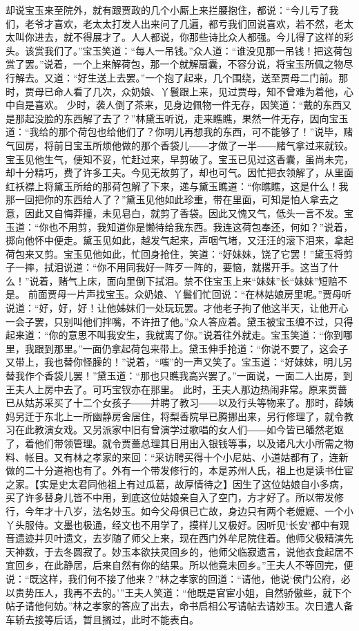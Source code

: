 \documentclass[12pt,oneside]{book}
\begin{document}
却说宝玉来至院外，就有跟贾政的几个小厮上来拦腰抱住，都说：“今儿亏了我们，老爷才喜欢，老太太打发人出来问了几遍，都亏我们回说喜欢，若不然，老太太叫你进去，就不得展才了。人人都说，你那些诗比众人都强。今儿得了这样的彩头。该赏我们了。”宝玉笑道：“每人一吊钱。”众人道：“谁没见那一吊钱！把这荷包赏了罢。”说着，一个上来解荷包，那一个就解扇囊，不容分说，将宝玉所佩之物尽行解去。又道：“好生送上去罢。”一个抱了起来，几个围绕，送至贾母二门前。那时，贾母已命人看了几次，众奶娘、丫鬟跟上来，见过贾母，知不曾难为着他，心中自是喜欢。
少时，袭人倒了茶来，见身边佩物一件无存，因笑道：“戴的东西又是那起没脸的东西解了去了？”林黛玉听说，走来瞧瞧，果然一件无存，因向宝玉道：“我给的那个荷包也给他们了？你明儿再想我的东西，可不能够了！”说毕，赌气回房，将前日宝玉所烦他做的那个香袋儿――才做了一半――赌气拿过来就铰。宝玉见他生气，便知不妥，忙赶过来，早剪破了。宝玉已见过这香囊，虽尚未完，却十分精巧，费了许多工夫。今见无故剪了，却也可气。因忙把衣领解了，从里面红袄襟上将黛玉所给的那荷包解了下来，递与黛玉瞧道：“你瞧瞧，这是什么！我那一回把你的东西给人了？”黛玉见他如此珍重，带在里面，可知是怕人拿去之意，因此又自悔莽撞，未见皂白，就剪了香袋。因此又愧又气，低头一言不发。宝玉道：“你也不用剪，我知道你是懒待给我东西。我连这荷包奉还，何如？”说着，掷向他怀中便走。黛玉见如此，越发气起来，声咽气堵，又汪汪的滚下泪来，拿起荷包来又剪。宝玉见他如此，忙回身抢住，笑道：“好妹妹，饶了它罢！”黛玉将剪子一摔，拭泪说道：“你不用同我好一阵歹一阵的，要恼，就撂开手。这当了什么！”说着，赌气上床，面向里倒下拭泪。禁不住宝玉上来“妹妹”长“妹妹”短赔不是。
前面贾母一片声找宝玉。众奶娘、丫鬟们忙回说：“在林姑娘房里呢。”贾母听说道：“好，好，好！让他姊妹们一处玩玩罢。才他老子拘了他这半天，让他开心一会子罢，只别叫他们拌嘴，不许扭了他。”众人答应着。黛玉被宝玉缠不过，只得起来道：“你的意思不叫我安生，我就离了你。”说着往外就走。宝玉笑道︰“你到哪里，我跟到那里。”一面仍拿起荷包来带上。黛玉伸手抢道：“你说不要了，这会子又带上，我也替你怪臊的！”说着，“嗤”的一声又笑了。宝玉道：“好妹妹，明儿另替我作个香袋儿罢！”黛玉道：“那也只瞧我高兴罢了。”一面说，一面二人出房，到王夫人上房中去了。可巧宝钗亦在那里。
此时，王夫人那边热闹非常。原来贾蔷已从姑苏采买了十二个女孩子――并聘了教习――以及行头等物来了。那时，薛姨妈另迁于东北上一所幽静房舍居住，将梨香院早已腾挪出来，另行修理了，就令教习在此教演女戏。又另派家中旧有曾演学过歌唱的女人们――如今皆已皤然老妪了，着他们带领管理。就令贾蔷总理其日用出入银钱等事，以及诸凡大小所需之物料、帐目。又有林之孝家的来回：“采访聘买得十个小尼姑、小道姑都有了，连新做的二十分道袍也有了。外有一个带发修行的，本是苏州人氏，祖上也是读书仕宦之家。【实是史太君同他祖上有过瓜葛，故厚情待之】因生了这位姑娘自小多病，买了许多替身儿皆不中用，到底这位姑娘亲自入了空门，方才好了。所以带发修行，今年才十八岁，法名妙玉。如今父母俱已亡故，身边只有两个老嬷嬷、一个小丫头服侍。文墨也极通，经文也不用学了，摸样儿又极好。因听见‘长安’都中有观音遗迹并贝叶遗文，去岁随了师父上来，现在西门外牟尼院住着。他师父极精演先天神数，于去冬圆寂了。妙玉本欲扶灵回乡的，他师父临寂遗言，说他衣食起居不宜回乡，在此静居，后来自然有你的结果。所以他竟未回乡。”王夫人不等回完，便说：“既这样，我们何不接了他来？”林之孝家的回道：“请他，他说‘侯门公府，必以贵势压人，我再不去的。’”王夫人笑道：“他既是官宦小姐，自然骄傲些，就下个帖子请他何妨。”林之孝家的答应了出去，命书启相公写请帖去请妙玉。次日遣人备车轿去接等后话，暂且搁过，此时不能表白。
\end{document}
